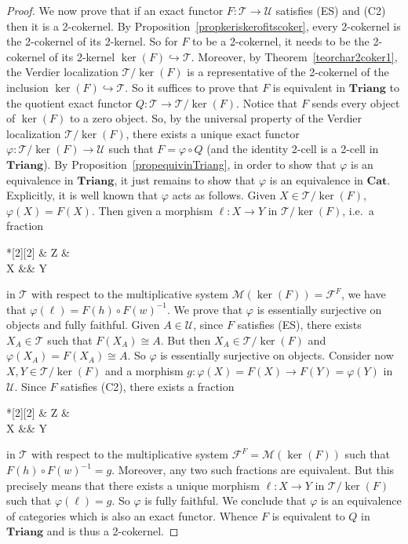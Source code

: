 \documentclass[11pt,reqno,a4paper]{amsart}
\theoremstyle{definition}
\theoremstyle{remark}
\def\nameit#1{\textrm{#1}~}
\def\thex{\nameit{Theorem}}
\def\prox{\nameit{Proposition}}
\newcommand{\T}{\mathcal{T}}
\newcommand{\U}{\mathcal{U}}
\newcommand{\0}{\mathbf{0}}
\renewcommand{\1}{\mathbf{1}}
\newcommand{\Cat}{\mathbf{Cat}}
\newcommand{\Triang}{\mathbf{Triang}}
\def\:{\colon}
\def\c{\circ}
\newcommand{\iso}{\cong}
\def\phi{\varphi}
\begin{document}
\begin{proof}
    We now prove that if an exact functor $F\:\T\to \U$ satisfies (ES) and (C2) then it is a 2-cokernel. By \prox\ref{propkeriskerofitscoker}, every 2-cokernel is the 2-cokernel of its 2-kernel. So for $F$ to be a 2-cokernel, it needs to be the 2-cokernel of its 2-kernel $\ker(F)\hookrightarrow \T$. Moreover, by \thex\ref{teorchar2coker1}, the Verdier localization $\T/\ker(F)$ is a representative of the 2-cokernel of the inclusion $\ker(F)\hookrightarrow \T$. So it suffices to prove that $F$ is equivalent in $\Triang$ to the quotient exact functor $Q:\T\to \T/\ker(F)$. Notice that $F$ sends every object of $\ker(F)$ to a zero object. So, by the universal property of the Verdier localization $\T/\ker(F)$, there exists a unique exact functor $\phi\:\T/\ker(F)\to \U$ such that $F=\phi\c Q$ (and the identity 2-cell is a 2-cell in $\Triang$). By \prox\ref{propequivinTriang}, in order to show that $\phi$ is an equivalence in $\Triang$, it just remains to show that $\phi$ is an equivalence in $\Cat$. Explicitly, it is well known that $\phi$ acts as follows. Given $X\in \T/\ker(F)$, $\phi(X)=F(X)$. Then given a morphism $\ell\:X\to Y$ in $\T/\ker(F)$, i.e.\ a fraction \begin{cd}*[2][2] \& Z \& \\[-2ex]
	X \&\& Y
	\arrow["w"', from=1-2, to=2-1]
	\arrow["h", from=1-2, to=2-3]\end{cd} in $\T$ with respect to the multiplicative system $\mathcal{M}(\ker(F))=\mathcal{F}^F$, we have that $\phi(\ell)=F(h)\c F(w)^{-1}$. We prove that $\phi$ is essentially surjective on objects and fully faithful. Given $A\in \U$, since $F$ satisfies (ES), there exists $X_A\in \T$ such that $F(X_A)\iso A$. But then $X_A\in \T/\ker(F)$ and $\phi(X_A)=F(X_A)\iso A$. So $\phi$ is essentially surjective on objects. Consider now $X,Y\in \T/\ker(F)$ and a morphism $g\:\phi(X)=F(X)\to F(Y)=\phi(Y)$ in $\U$. Since $F$ satisfies (C2), there exists a fraction \begin{cd}*[2][2] \& Z \& \\[-2ex]
	X \&\& Y
	\arrow["w"', from=1-2, to=2-1]
	\arrow["h", from=1-2, to=2-3]\end{cd} in $\T$ with respect to the multiplicative system $\mathcal{F}^F=\mathcal{M}(\ker(F))$ such that $F(h) \circ F(w)^{-1}=g$. Moreover, any two such fractions are equivalent. But this precisely means that there exists a unique morphism $\ell\:X\to Y$ in $\T/\ker(F)$ such that $\phi(\ell)=g$. So $\phi$ is fully faithful. We conclude that $\phi$ is an equivalence of categories which is also an exact functor. Whence $F$ is equivalent to $Q$ in $\Triang$ and is thus a 2-cokernel.
\end{proof}
\end{document}
